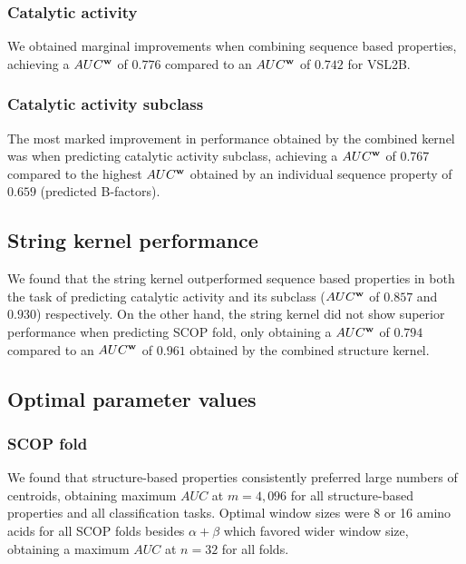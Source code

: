 \subsubsection{Catalytic activity}

We obtained marginal improvements when combining sequence based properties, achieving a $AUC^{\bf{w}}$ of $0.776$ compared to an $AUC^{\bf{w}}$ of $0.742$ for VSL2B.


\subsubsection{Catalytic activity subclass}

The most marked improvement in performance obtained by the combined kernel was when predicting catalytic activity subclass, achieving a $AUC^{\bf{w}}$ of $0.767$ compared to the highest $AUC^{\bf{w}}$ obtained by an individual sequence property of $0.659$ (predicted B-factors).

\subsection{String kernel performance}

We found that the string kernel outperformed sequence based properties in both the task of predicting catalytic activity and its subclass ($AUC^{\bf{w}}$ of $0.857$ and $0.930$) respectively.  On the other hand, the string kernel did not show superior performance when predicting SCOP fold, only obtaining a $AUC^{\bf{w}}$ of $0.794$ compared to an $AUC^{\bf{w}}$ of $0.961$ obtained by the combined structure kernel.

\subsection{Optimal parameter values}

\subsubsection{SCOP fold}
We found that structure-based properties consistently preferred large numbers of centroids, obtaining maximum $AUC$ at $m=4,096$ for all structure-based properties and all classification tasks.  Optimal window sizes were 8 or 16 amino acids for all SCOP folds besides $\alpha + \beta$ which favored wider window size, obtaining a maximum $AUC$ at $n=32$ for all folds.

